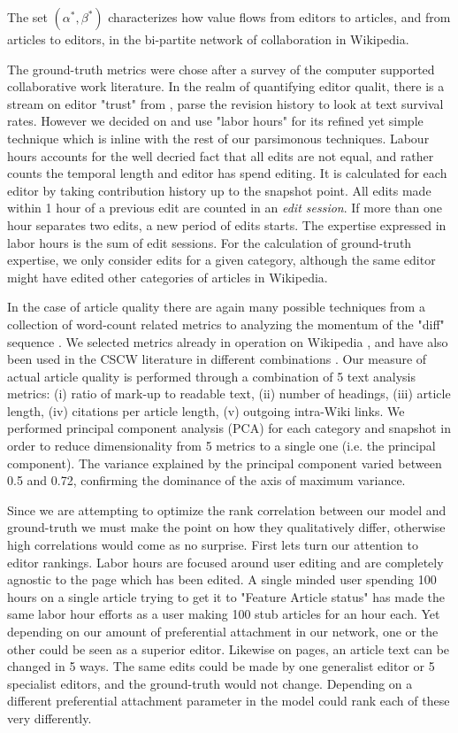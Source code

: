 The set $(\alpha^*,\beta^*)$ characterizes how value flows from editors to articles, and from articles to editors, in the bi-partite network of collaboration in Wikipedia.

The ground-truth metrics were chose after a survey of the computer supported collaborative work literature. In the realm of quantifying editor qualit, there is a stream on editor "trust" from \cite{adler07} \cite{adler08} \cite{zeng}, parse the revision history to look at text survival rates. However we decided on \cite{geiger2013} and use "labor hours" for its refined yet simple technique which is inline with the rest of our parsimonous techniques. Labour hours accounts for the well decried fact that all edits are not equal, and rather counts the temporal length and editor has spend editing. It is calculated for each editor by taking contribution history up to the snapshot point. All edits made within 1 hour of a previous edit are counted in an {\it edit session}. If more than one hour separates two edits, a new period of edits  starts. The expertise expressed in labor hours is the sum of edit sessions. For the calculation of ground-truth expertise, we only consider edits for a given category, although the same editor might have edited other categories of articles in Wikipedia. 

In the case of article quality there are again many possible techniques from a collection of word-count related metrics \cite{blumenstock} to analyzing the momentum of the "diff" sequence \cite{wohner}. We selected metrics already in operation on Wikipedia \cite{wang2013tell} \cite{klein}, and have also been used in the CSCW literature in different combinations \cite{kane2011} \cite{keegan2012}. Our measure of actual article quality is performed through a combination of 5 text analysis metrics: (i) ratio of mark-up to readable text, (ii) number of headings, (iii) article length, (iv) citations per article length, (v) outgoing intra-Wiki links. We performed principal component analysis (PCA) for each category and snapshot in order to reduce dimensionality from 5 metrics to a single one (i.e. the principal component). The variance explained by the principal component varied between 0.5 and 0.72, confirming the dominance of the axis of maximum variance.

Since we are attempting to optimize the rank correlation between our model and ground-truth we must make the point on how they qualitatively differ, otherwise high correlations would come as no surprise. First lets turn our attention to editor rankings. Labor hours are focused around user editing and are completely agnostic to the page which has been edited. A single minded user spending 100 hours on a single article trying to get it to "Feature Article status" has made the same labor hour efforts as a user making 100 stub articles for an hour each. Yet depending on our amount of preferential attachment in our network, one or the other could be seen as a superior editor. Likewise on pages, an article text can be changed in 5 ways. The same edits could be made by one generalist editor or 5 specialist editors, and the ground-truth would not change. Depending on a different preferential attachment parameter in the model could rank each of these very differently.

